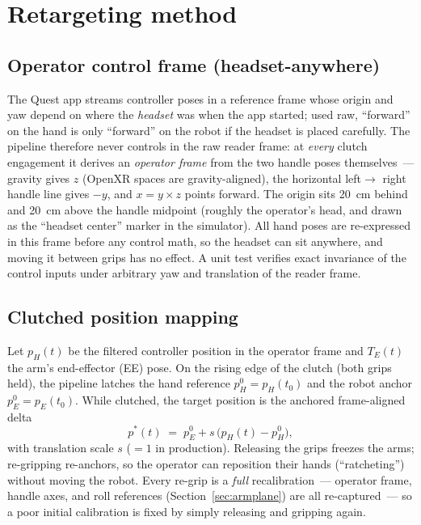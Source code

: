 \section{Retargeting method}
\label{sec:method}

\subsection{Operator control frame (headset-anywhere)}
\label{sec:opframe}

The Quest app streams controller poses in a reference frame whose origin
and yaw depend on where the \emph{headset} was when the app started; used
raw, ``forward'' on the hand is only ``forward'' on the robot if the
headset is placed carefully. The pipeline therefore never controls in the
raw reader frame: at \emph{every} clutch engagement it derives an
\emph{operator frame} from the two handle poses themselves~--- gravity
gives \(z\) (OpenXR spaces are gravity-aligned), the horizontal left\(\to\)
right handle line gives \(-y\), and \(x = y \times z\) points forward. The
origin sits \SI{20}{cm} behind and \SI{20}{cm} above the handle midpoint
(roughly the operator's head, and drawn as the ``headset center'' marker in
the simulator). All hand poses are re-expressed in this frame before any
control math, so the headset can sit anywhere, and moving it between grips
has no effect. A unit test verifies exact invariance of the control inputs
under arbitrary yaw and translation of the reader frame.

\subsection{Clutched position mapping}

Let \(p_H(t)\) be the filtered controller position in the operator frame
and \(T_E(t)\) the arm's end-effector (EE) pose. On the rising edge of the
clutch (both grips held), the pipeline latches the hand reference
\(p_H^0 = p_H(t_0)\) and the robot anchor \(p_E^0 = p_E(t_0)\). While
clutched, the target position is the anchored frame-aligned delta
\begin{equation}
  p^\ast(t) \;=\; p_E^0 + s\,\bigl(p_H(t) - p_H^0\bigr),
  \label{eq:clutch}
\end{equation}
with translation scale \(s\) (\(=1\) in production). Releasing the grips
freezes the arms; re-gripping re-anchors, so the operator can reposition
their hands (``ratcheting'') without moving the robot. Every re-grip is a
\emph{full} recalibration~--- operator frame, handle axes, and roll
references (Section~\ref{sec:armplane}) are all re-captured~--- so a poor
initial calibration is fixed by simply releasing and gripping again.


